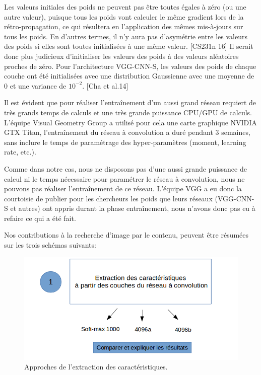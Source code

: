 	Les valeurs initiales des poids ne peuvent pas être toutes égales à zéro (ou une autre valeur), puisque tous les poids vont calculer le même gradient lors de la rétro-propagation, ce qui résultera en l'application des mêmes mis-à-jours sur tous les poids. En d'autres termes, il n'y aura pas d’asymétrie entre les valeurs des poids si elles sont toutes initialisées à une même valeur. [CS231n 16]	
	Il serait donc plus judicieux d'initialiser les valeurs des poids à des valeurs aléatoires proches de zéro. Pour l'architecture VGG-CNN-S, les valeurs des poids de chaque couche ont été initialisées avec une distribution Gaussienne avec une moyenne de 0 et une variance de $10^{-2}$. [Cha et al.14]
	
	Il est évident que pour réaliser l’entraînement d'un aussi grand réseau requiert de très grands temps de calculs et une très grande puissance CPU/GPU de calculs. L'équipe Visual Geometry Group a utilisé pour cela une carte graphique NVIDIA GTX Titan, l'entraînement du réseau à convolution a duré pendant 3 semaines, sans inclure le temps de paramétrage des hyper-paramètres (moment, learning rate, etc.).
	
	Comme dans notre cas, nous ne disposons pas d'une aussi grande puissance de calcul ni le temps nécessaire pour paramétrer le réseau à convolution, nous ne pouvons pas réaliser l’entraînement de ce réseau. L'équipe VGG a eu donc la courtoisie de publier pour les chercheurs les poids que leurs réseaux (VGG-CNN-S et autres) ont appris durant la phase entraînement, nous n'avons donc pas eu à refaire ce qui a été fait.
	
	Nos contributions à la recherche d'image par le contenu, peuvent être résumées sur les trois schémas suivants:
	
	\begin{figure}[H]
	\centering
		\includegraphics[width=5in]{Figures/diagramme1.png}
	\caption[An Electron]{Approches de l'extraction des caractéristiques.}
	\label{fig:Electron}
\end{figure} 

